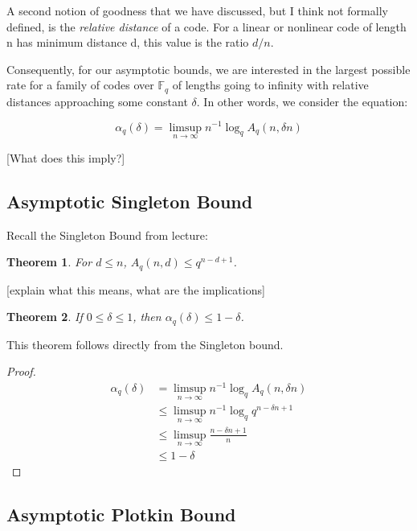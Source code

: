 \documentclass{article}
\newtheorem{theorem}{Theorem}
\numberwithin{theorem}{subsection}
\theoremstyle{definition}
\numberwithin{exmp}{subsection}
\theoremstyle{definition}
\numberwithin{defn}{subsection}
\theoremstyle{definition}
\numberwithin{claim}{subsection}
\begin{document}
A second notion of goodness that we have discussed, but I think not formally defined, is the \textit{relative distance} of a code.  For a linear or nonlinear code of length n
has minimum distance d, this value is the ratio $d/n$. 

Consequently, for our asymptotic bounds, we are interested in the largest possible rate for a family of codes over $\mathbb{F}_q$ of lengths going to infinity with relative 
distances approaching some constant $\delta$.  In other words, we consider the equation:

\begin{equation}
\alpha_{q}(\delta) = \limsup_{n \to \infty} n^{-1} \log_q A_q(n,\delta n)
\end{equation}


[What does this imply?]

\subsection{Asymptotic Singleton Bound}

Recall the Singleton Bound from lecture:

\begin{theorem}
For $d \le n$, $A_q(n,d) \le q^{n-d+1}$.
\end{theorem}

[explain what this means, what are the implications]


\begin{theorem}
If $0 \le \delta \le 1$, then $\alpha_q(\delta) \le 1 - \delta$.
\end{theorem} 
This theorem follows directly from the Singleton bound.

\begin{proof}
\begin{equation} 
\begin{split}
\alpha_{q}(\delta) & = \limsup_{n \to \infty} n^{-1} \log_q A_q(n,\delta n) \\
& \le \limsup_{n \to \infty} n^{-1} \log_q q^{n-\delta n+1} \\
& \le \limsup_{n \to \infty} \frac{n-\delta n+1}{n} \\
& \le 1 - \delta
\end{split}
\end{equation}
\end{proof}

\subsection{Asymptotic Plotkin Bound}
\end{document}

